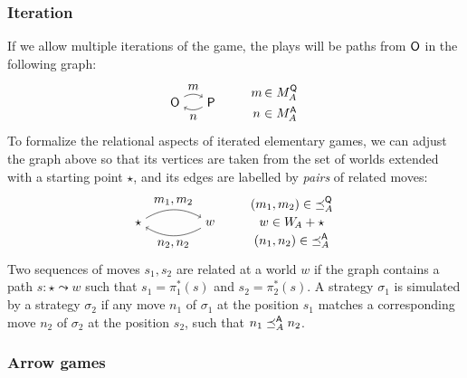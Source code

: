 \subsubsection{Iteration}

If we allow multiple iterations of the game,
the plays will be paths from $ \mathsf{O} $ in the following graph:
\[
  \begin{tikzpicture}[baseline=(O.base)]
    \node (O) at (0,0) {\kw{O}};
    \node (P) at (1,0) {\kw{P}};
    \path [->] (O) edge[bend left] node[auto] {$m$} (P);
    \path [->] (P) edge[bend left] node[auto] {$n$} (O);
  \end{tikzpicture}
  \qquad
  \begin{array}{c@{\,}l}
    m &\in M_A^\kw{Q} \\[1ex]
    n &\in M_A^\kw{A}
  \end{array}
\]
To formalize the relational aspects of iterated elementary games,
we can adjust the graph above so that its vertices are taken
from the set of worlds extended with a starting point $\star$,
and its edges are labelled by \emph{pairs} of related moves:
\[
  \begin{tikzpicture}[baseline=(O.base)]
    \node (O) at (0,0) {$\star$};
    \node (P) at (2,0) {$w$};
    \path [->] (O) edge[bend left] node[auto] {$m_1, m_2$} (P);
    \path [->] (P) edge[bend left] node[auto] {$n_2, n_2$} (O);
  \end{tikzpicture}
  \qquad
  \begin{array}{c}
    (m_1, m_2) \in {\preceq}_A^\kw{Q} \\[.5ex]
    w \in W_{\!A} + \star \\[.5ex]
    (n_1, n_2) \in {\preceq}_A^\kw{A}
  \end{array}
\]
Two sequences of moves $s_1, s_2$
are related at a world $w$
if the graph contains a path $s : \star \leadsto w$
such that $s_1 = \pi_1^*(s)$ and $s_2 = \pi_2^*(s)$.
A strategy $\sigma_1$ is simulated by a strategy $\sigma_2$ if
any move $n_1$ of $\sigma_1$ at the position $s_1$
matches a corresponding move $n_2$ of $\sigma_2$ at the position $s_2$,
such that $n_1 \preceq_A^{ \mathsf{A} } n_2$.

\subsubsection{Arrow games}

